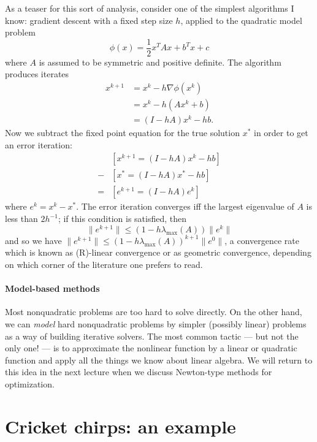 \documentclass[12pt, leqno]{article} %
\begin{document}
As a teaser for this sort of analysis, consider one of the simplest
algorithms I know: gradient descent with a fixed step size $h$, applied
to the quadratic model problem
\[
  \phi(x) = \frac{1}{2} x^T A x + b^T x + c
\]
where $A$ is assumed to be symmetric and positive definite.  The
algorithm produces iterates
\begin{align*}
  x^{k+1}
  &= x^k - h \nabla \phi(x^k) \\
  &= x^k - h (Ax^k + b) \\
  &= (I-hA) x^k - h b.
\end{align*}
Now we subtract the fixed point equation for the true solution $x^*$
in order to get an error iteration:
\begin{align*}
    & [x^{k+1} = (I-hA) x^k - hb] \\
  - & [x^*     = (I-hA) x^* - hb] \\ \hline
  = & [e^{k+1} = (I-hA) e^k ]
\end{align*}
where $e^k = x^k-x^*$.  The error iteration converges iff the largest
eigenvalue of $A$ is less than $2 h^{-1}$; if this condition is
satisfied, then
\[
  \|e^{k+1}\| \leq (1-h\lambda_{\max}(A)) \|e^k\|
\]
and so we have $\|e^{k+1}\| \leq (1-h\lambda_{\max}(A))^{k+1} \|e^0\|$,
a convergence rate which is known as (R)-linear convergence or
as geometric convergence, depending on which corner of the literature
one prefers to read.

\paragraph{Model-based methods}

Most nonquadratic problems are too hard to solve directly.  On the other
hand, we can {\em model} hard nonquadratic problems by simpler (possibly
linear) problems as a way of building iterative solvers.  The most
common tactic --- but not the only one! --- is to approximate the
nonlinear function by a linear or quadratic function and apply all the
things we know about linear algebra.  We will return to this idea in
the next lecture when we discuss Newton-type methods for optimization.


\section{Cricket chirps: an example}
\end{document}
